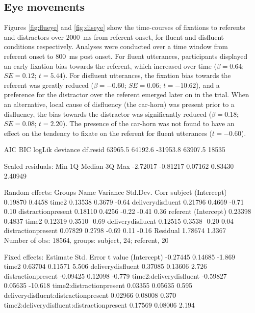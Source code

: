 \documentclass[a4paper,man,natbib]{apa6}
\newcommand*{\SE}{\mathit{SE}} %
\begin{document}
\subsection{Eye movements}
Figures \ref{fig:flueye} and \ref{fig:diseye} show the time-courses of fixations to referents and distractors over 2000~ms from referent onset, for fluent and disfluent conditions respectively.
Analyses were conducted over a time window from referent onset to 800~ms post onset.
For fluent utterances, participants displayed an early fixation bias towards the referent, which increased over time ($\beta = 0.64$; $\SE = 0.12$; $t=5.44$). 
For disfluent utterances, the fixation bias towards the referent was greatly reduced ($\beta = -0.60$; $\SE = 0.06$; $t=-10.62$), and a preference for the distractor over the referent emerged later on in the trial.
When an alternative, local cause of disfluency (the car-horn) was present prior to a disfluency, the bias towards the distractor was significantly reduced ($\beta = 0.18$; $\SE = 0.08$; $t=2.20$).
The presence of the car-horn was not found to have an effect on the tendency to fixate on the referent for fluent utterances ($t=-0.60$).


\iffalse
     AIC      BIC   logLik deviance df.resid 
 63965.5  64192.6 -31953.8  63907.5    18535 

Scaled residuals: 
     Min       1Q   Median       3Q      Max 
-2.72017 -0.81217  0.07162  0.83430  2.40949 

Random effects:
 Groups   Name               Variance Std.Dev. Corr             
 subject  (Intercept)        0.19870  0.4458                    
          time2              0.13538  0.3679   -0.64            
          deliverydisfluent  0.21796  0.4669   -0.71  0.10      
          distractionpresent 0.18110  0.4256   -0.22 -0.41  0.36
 referent (Intercept)        0.23398  0.4837                    
          time2              0.12319  0.3510   -0.69            
          deliverydisfluent  0.12515  0.3538   -0.20  0.04      
          distractionpresent 0.07829  0.2798   -0.69  0.11 -0.16
 Residual                    1.78674  1.3367                    
Number of obs: 18564, groups:  subject, 24; referent, 20

Fixed effects:
                                           Estimate Std. Error t value
(Intercept)                                -0.27445    0.14685  -1.869
time2                                       0.63704    0.11571   5.506
deliverydisfluent                           0.37085    0.13606   2.726
distractionpresent                         -0.09425    0.12098  -0.779
time2:deliverydisfluent                    -0.59827    0.05635 -10.618
time2:distractionpresent                    0.03355    0.05635   0.595
deliverydisfluent:distractionpresent        0.02966    0.08008   0.370
time2:deliverydisfluent:distractionpresent  0.17569    0.08006   2.194
\end{document}
